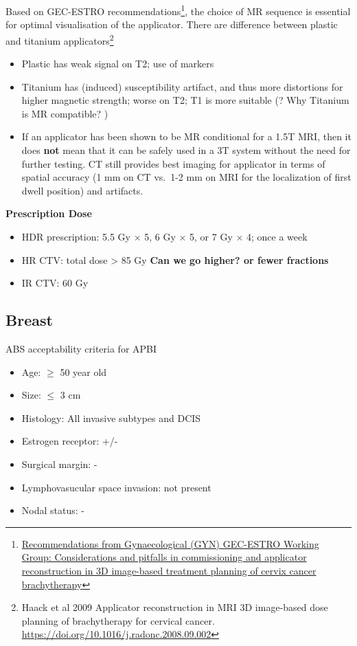 \documentclass[]{book}
\providecommand{\tightlist}{%
  \setlength{\itemsep}{0pt}\setlength{\parskip}{0pt}}
\let\rmarkdownfootnote\footnote%
\def\footnote{\protect\rmarkdownfootnote}
\theoremstyle{definition}
\theoremstyle{definition}
\theoremstyle{definition}
\theoremstyle{remark}
\begin{document}
Based on GEC-ESTRO recommendations\footnote{\href{https://www.sciencedirect.com/science/article/pii/S0167814010003683}{Recommendations
  from Gynaecological (GYN) GEC-ESTRO Working Group: Considerations and
  pitfalls in commissioning and applicator reconstruction in 3D
  image-based treatment planning of cervix cancer brachytherapy}}, the
choice of MR sequence is essential for optimal visualisation of the
applicator. There are difference between plastic and titanium
applicators\footnote{Haack et al 2009 Applicator reconstruction in MRI
  3D image-based dose planning of brachytherapy for cervical cancer.
  \url{https://doi.org/10.1016/j.radonc.2008.09.002}}

\begin{itemize}
\tightlist
\item
  Plastic has weak signal on T2; use of markers
\item
  Titanium has (induced) susceptibility artifact, and thus more
  distortions for higher magnetic strength; worse on T2; T1 is more
  suitable (? Why Titanium is MR compatible? )
\item
  If an applicator has been shown to be MR conditional for a 1.5T MRI,
  then it does \textbf{not} mean that it can be safely used in a 3T
  system without the need for further testing. CT still provides best
  imaging for applicator in terms of spatial accuracy (1 mm on CT
  vs.~1-2 mm on MRI for the localization of first dwell position) and
  artifacts.
\end{itemize}

\textbf{Prescription Dose}

\begin{itemize}
\tightlist
\item
  HDR prescription: 5.5 Gy \(\times\) 5, 6 Gy \(\times\) 5, or 7 Gy
  \(\times\) 4; once a week
\item
  HR CTV: total dose \textgreater{} 85 Gy \textbf{Can we go higher? or
  fewer fractions}
\item
  IR CTV: 60 Gy
\end{itemize}

\subsection{Breast}\label{breast}

ABS acceptability criteria for APBI

\begin{itemize}
\tightlist
\item
  Age: \(\ge\) 50 year old
\item
  Size: \(\le\) 3 cm
\item
  Histology: All invasive subtypes and DCIS
\item
  Estrogen receptor: +/-
\item
  Surgical margin: -
\item
  Lymphovasucular space invasion: not present
\item
  Nodal status: -
\end{itemize}
\end{document}
